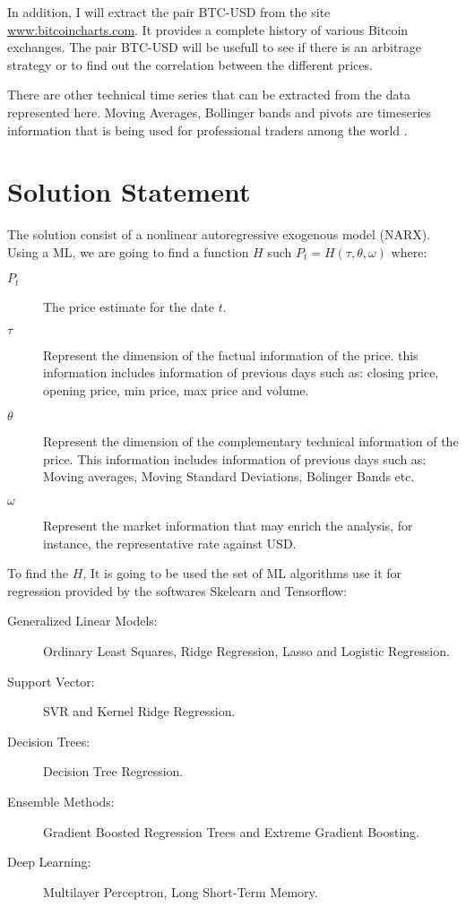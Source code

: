 \documentclass{article}
\begin{document}
In addition, I will  extract the pair BTC-USD from the site \url{www.bitcoincharts.com}. It provides a complete history of various Bitcoin exchanges. The pair BTC-USD will be usefull to see if there is an arbitrage strategy or to find out the correlation between the different prices.

There are other technical time series that can be extracted from the data represented here. Moving Averages, Bollinger bands and pivots are timeseries information that is being used  for professional traders among the world \cite{ARTICLE:15}.


\section{Solution Statement} \label{sol}


The solution consist of a nonlinear autoregressive exogenous model (NARX). Using a ML, we are going to find a function $ H $ such $ P_t = H ( \tau , \theta , \omega ) $ where:
\begin{description}

\item[$ P_t $] The price estimate for the date $ t $.
\item[$ \tau $] Represent the dimension of the factual information of the price. this information includes information of previous days  such as: closing price, opening price, min price, max price and volume.
\item[$ \theta $] Represent the dimension of the complementary technical  information of the price. This information includes information of previous days  such as: Moving averages, Moving Standard Deviations, Bolinger Bands etc.
\item[$ \omega $] Represent the market information that may enrich the analysis, for instance, the representative rate against USD.

\end{description}

To find the $ H $, It is going to be used the  set of ML algorithms use it for regression provided by the softwares Skelearn \cite{scikit-learn} and Tensorflow\cite{tensorflow2015-whitepaper}:

\begin{description}

\item[Generalized Linear Models:] Ordinary Least Squares, Ridge Regression, Lasso and Logistic Regression.
\item[Support Vector:] SVR and Kernel Ridge Regression.
\item[Decision Trees:] Decision Tree Regression.
\item[Ensemble Methods:] Gradient Boosted Regression Trees and Extreme Gradient Boosting.
\item[Deep Learning:] Multilayer Perceptron, Long Short-Term Memory.

\end{description}
\end{document}
